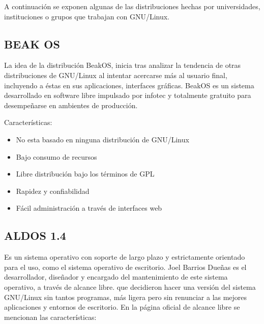 A continuación se exponen algunas de las distribuciones hechas
por universidades, instituciones o grupos que trabajan con
GNU/Linux.

\subsection*{BEAK OS}
La idea de la distribución BeakOS, inicia tras analizar la
tendencia de otras distribuciones de GNU/Linux al intentar
acercarse más al usuario final, incluyendo a éstas en sus
aplicaciones, interfaces gráficas. BeakOS es un sistema
desarrollado en software libre impulsado por infotec y
totalmente gratuito para desempeñarse en ambientes de
producción.

Características:
\begin{itemize}
  \item No esta basado en ninguna distribución de GNU/Linux
  \item Bajo consumo de recursos
  \item Libre distribución bajo los términos de GPL
  \item Rapidez y confiabilidad
  \item Fácil administración a través de interfaces web
\end{itemize}

\subsection*{ALDOS 1.4}
Es un sistema operativo con soporte de largo plazo y
estrictamente orientado para el uso, como el sistema operativo
de escritorio. Joel Barrios Dueñas es el desarrollador, diseñador
y encargado del mantenimiento de este sistema operativo, a
través de alcance libre. que decidieron hacer una versión del
sistema GNU/Linux sin tantos programas, más ligera pero sin
renunciar a las mejores aplicaciones y entornos de escritorio.
En la página oficial de alcance libre se mencionan las
características:


